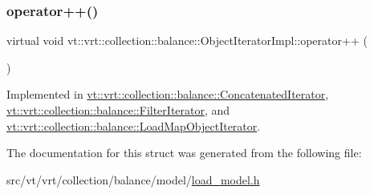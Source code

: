 \subsubsection{\texorpdfstring{operator++()}{operator++()}}
{\footnotesize\ttfamily virtual void vt\+::vrt\+::collection\+::balance\+::\+Object\+Iterator\+Impl\+::operator++ (\begin{DoxyParamCaption}{ }\end{DoxyParamCaption})\hspace{0.3cm}{\ttfamily [pure virtual]}}



Implemented in \hyperlink{structvt_1_1vrt_1_1collection_1_1balance_1_1_concatenated_iterator_aa89d0b18e2595bda59867f3254658125}{vt\+::vrt\+::collection\+::balance\+::\+Concatenated\+Iterator}, \hyperlink{structvt_1_1vrt_1_1collection_1_1balance_1_1_filter_iterator_a354817d66e2736b1de818b4548419476}{vt\+::vrt\+::collection\+::balance\+::\+Filter\+Iterator}, and \hyperlink{structvt_1_1vrt_1_1collection_1_1balance_1_1_load_map_object_iterator_ad475d61170e3aea498d4d2c403bcc0b1}{vt\+::vrt\+::collection\+::balance\+::\+Load\+Map\+Object\+Iterator}.



The documentation for this struct was generated from the following file\+:\begin{DoxyCompactItemize}
\item 
src/vt/vrt/collection/balance/model/\hyperlink{load__model_8h}{load\+\_\+model.\+h}\end{DoxyCompactItemize}
